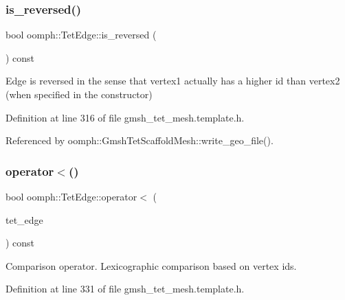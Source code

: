 \mbox{\label{classoomph_1_1TetEdge_a9a124de5c191e1b0e43ed92c2a867c55}} 
\subsubsection{\texorpdfstring{is\+\_\+reversed()}{is\_reversed()}}
{\footnotesize\ttfamily bool oomph\+::\+Tet\+Edge\+::is\+\_\+reversed (\begin{DoxyParamCaption}{ }\end{DoxyParamCaption}) const\hspace{0.3cm}{\ttfamily [inline]}}



Edge is reversed in the sense that vertex1 actually has a higher id than vertex2 (when specified in the constructor) 



Definition at line 316 of file gmsh\+\_\+tet\+\_\+mesh.\+template.\+h.



Referenced by oomph\+::\+Gmsh\+Tet\+Scaffold\+Mesh\+::write\+\_\+geo\+\_\+file().

\mbox{\label{classoomph_1_1TetEdge_ac8d4b17db0a1e741664d8029ffb419b9}} 
\subsubsection{\texorpdfstring{operator$<$()}{operator<()}}
{\footnotesize\ttfamily bool oomph\+::\+Tet\+Edge\+::operator$<$ (\begin{DoxyParamCaption}\item[{const \hyperlink{classoomph_1_1TetEdge}{Tet\+Edge} \&}]{tet\+\_\+edge }\end{DoxyParamCaption}) const\hspace{0.3cm}{\ttfamily [inline]}}



Comparison operator. Lexicographic comparison based on vertex ids. 



Definition at line 331 of file gmsh\+\_\+tet\+\_\+mesh.\+template.\+h.



